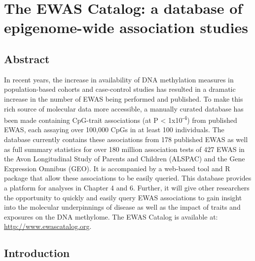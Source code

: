 \documentclass[11pt,oneside]{bristolthesis}
\begin{document}
\hypertarget{ewas-catalog}{%
\chapter{The EWAS Catalog: a database of epigenome-wide association studies}\label{ewas-catalog}}

\hypertarget{abstract-03}{%
\section{Abstract}\label{abstract-03}}

In recent years, the increase in availability of DNA methylation measures in population-based cohorts and case-control studies has resulted in a dramatic increase in the number of EWAS being performed and published. To make this rich source of molecular data more accessible, a manually curated database has been made containing CpG-trait associations (at P \textless{} 1x10\textsuperscript{-4}) from published EWAS, each assaying over 100,000 CpGs in at least 100 individuals. The database currently contains these associations from 178 published EWAS as well as full summary statistics for over 180 million association tests of 427 EWAS in the Avon Longitudinal Study of Parents and Children (ALSPAC) and the Gene Expression Omnibus (GEO). It is accompanied by a web-based tool and R package that allow these associations to be easily queried. This database provides a platform for analyses in Chapter 4 and 6. Further, it will give other researchers the opportunity to quickly and easily query EWAS associations to gain insight into the molecular underpinnings of disease as well as the impact of traits and exposures on the DNA methylome. The EWAS Catalog is available at: \url{http://www.ewascatalog.org}.

\hypertarget{introduction-03}{%
\section{Introduction}\label{introduction-03}}
\end{document}
